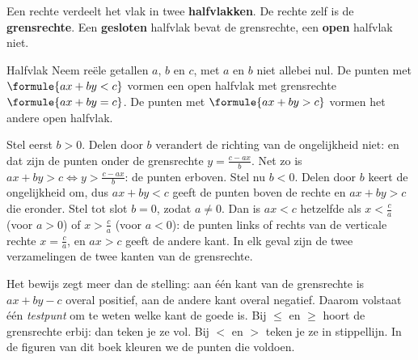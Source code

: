 \begin{theorie}
Een rechte verdeelt het vlak in twee \textbf{\textcolor{accent}{halfvlakken}}. De rechte zelf is de \textbf{\textcolor{accent}{grensrechte}}. Een \textbf{\textcolor{accent}{gesloten}} halfvlak bevat de grensrechte, een \textbf{\textcolor{accent}{open}} halfvlak niet.

\begin{stelling}{Halfvlak}
Neem reële getallen $a$, $b$ en $c$, met $a$ en $b$ niet allebei nul. De punten met $\formule{ax + by < c}$ vormen een open halfvlak met grensrechte $\formule{ax + by = c}$. De punten met $\formule{ax + by > c}$ vormen het andere open halfvlak.
\end{stelling}

\begin{bewijs}
Stel eerst $b > 0$. Delen door $b$ verandert de richting van de ongelijkheid niet:
en dat zijn de punten onder de grensrechte $y = \tfrac{c - ax}{b}$. Net zo is $ax + by > c \iff y > \tfrac{c - ax}{b}$: de punten erboven. Stel nu $b < 0$. Delen door $b$ keert de ongelijkheid om, dus $ax + by < c$ geeft de punten boven de rechte en $ax + by > c$ die eronder. Stel tot slot $b = 0$, zodat $a \neq 0$. Dan is $ax < c$ hetzelfde als $x < \tfrac ca$ (voor $a > 0$) of $x > \tfrac ca$ (voor $a < 0$): de punten links of rechts van de verticale rechte $x = \tfrac ca$, en $ax > c$ geeft de andere kant. In elk geval zijn de twee verzamelingen de twee kanten van de grensrechte.
\end{bewijs}
\end{theorie}

Het bewijs zegt meer dan de stelling: aan één kant van de grensrechte is $ax + by - c$ overal positief, aan de andere kant overal negatief. Daarom volstaat één \emph{testpunt} om te weten welke kant de goede is. Bij $\leqslant$ en $\geqslant$ hoort de grensrechte erbij: dan teken je ze vol. Bij $<$ en $>$ teken je ze in stippellijn. In de figuren van dit boek kleuren we de punten die voldoen.

